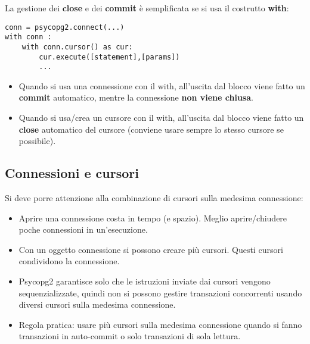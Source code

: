 \documentclass[a4paper, 10pt, titlepage]{article}
\begin{document}
	La gestione dei \textbf{close} e dei \textbf{commit} è semplificata se si usa il costrutto \textbf{with}:
	\begin{lstlisting}[frame=tb]
conn = psycopg2.connect(...)
with conn :
	with conn.cursor() as cur:
		cur.execute([statement],[params])
		...
	\end{lstlisting}
	\begin{itemize}
	\item Quando si usa una connessione con il with, all’uscita dal blocco viene fatto un \textbf{commit} automatico, mentre la connessione \textbf{non viene chiusa}.
	\item Quando si usa/crea un cursore con il with, all’uscita dal blocco viene fatto un \textbf{close} automatico del cursore (conviene usare sempre lo stesso cursore se possibile).
	\end{itemize}
	\subsection{Connessioni e cursori}
	Si deve porre attenzione alla combinazione di cursori sulla medesima connessione:
	\begin{itemize}
	\item Aprire una connessione costa in tempo (e spazio). Meglio
aprire/chiudere poche connessioni in un’esecuzione.
	\item Con un oggetto connessione si possono creare più cursori. Questi cursori condividono la connessione.
	\item Psycopg2 garantisce solo che le istruzioni inviate dai cursori vengono sequenzializzate, quindi non si possono gestire transazioni concorrenti usando diversi cursori sulla medesima connessione.
	\item Regola pratica: usare più cursori sulla medesima connessione quando si fanno transazioni in auto-commit o solo transazioni di sola lettura.
	\end{itemize}
	
\end{document}
